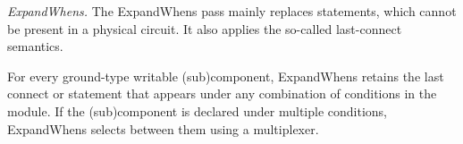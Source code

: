 %

\smallskip
\noindent\emph{ExpandWhens.} The ExpandWhens pass mainly replaces  statements, which cannot be present in a physical circuit.
It also applies the so-called last-connect semantics.

For every ground-type writable (sub)component, ExpandWhens retains the last connect or   statement
that appears under any combination of  conditions in the module.
If the (sub)component is declared under multiple conditions,
ExpandWhens selects between them using a multiplexer.

